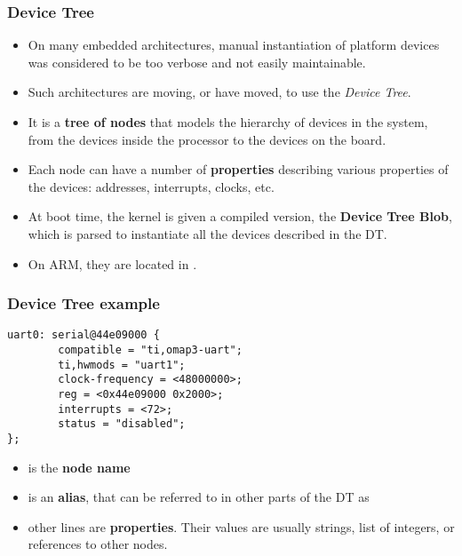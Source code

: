 \begin{frame}
  \frametitle{Device Tree}
  \begin{itemize}
  \item On many embedded architectures, manual instantiation of
    platform devices was considered to be too verbose and not easily
    maintainable.
  \item Such architectures are moving, or have moved, to use the {\em
      Device Tree}.
  \item It is a {\bf tree of nodes} that models the hierarchy of
    devices in the system, from the devices inside the processor to
    the devices on the board.
  \item Each node can have a number of {\bf properties} describing
    various properties of the devices: addresses, interrupts, clocks,
    etc.
  \item At boot time, the kernel is given a compiled version, the {\bf
      Device Tree Blob}, which is parsed to instantiate all the
    devices described in the DT.
  \item On ARM, they are located in .
  \end{itemize}
\end{frame}

\begin{frame}[fragile]
  \frametitle{Device Tree example}
  \begin{block}{}
\begin{verbatim}
uart0: serial@44e09000 {
        compatible = "ti,omap3-uart";
        ti,hwmods = "uart1";
        clock-frequency = <48000000>;
        reg = <0x44e09000 0x2000>;
        interrupts = <72>;
        status = "disabled";
};
  \end{verbatim}
  \end{block}
  \normalsize
  \begin{itemize}
  \item {} is the {\bf node name}
  \item {} is an {\bf alias}, that can be referred to in other
    parts of the DT as 
  \item other lines are {\bf properties}. Their values are usually
    strings, list of integers, or references to other nodes.
  \end{itemize}
\end{frame}

